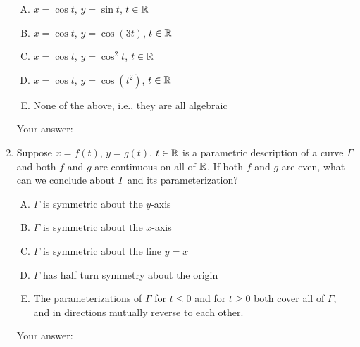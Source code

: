\documentclass[10pt]{amsart}
\begin{document}
\begin{enumerate}
  \begin{enumerate}[(A)]
  \item $x = \cos t$, $y = \sin t$, $t \in \mathbb{R}$
  \item $x = \cos t$, $y = \cos(3t)$, $t \in \mathbb{R}$
  \item $x = \cos t$, $y = \cos^2t$, $t \in \mathbb{R}$
  \item $x = \cos t$, $y = \cos(t^2)$, $t \in \mathbb{R}$
  \item None of the above, i.e., they are all algebraic
  \end{enumerate}

  \vspace{0.1in}
  Your answer: $\underline{\qquad\qquad\qquad\qquad\qquad\qquad\qquad}$
  \vspace{0.6in}

\item Suppose $x = f(t)$, $y = g(t)$, $t \in \mathbb{R}$ is a parametric
  description of a curve $\Gamma$ and both $f$ and $g$ are continuous
  on all of $\mathbb{R}$. If both $f$ and $g$ are even, what can we conclude
  about $\Gamma$ and its parameterization?

  \begin{enumerate}[(A)]
  \item $\Gamma$ is symmetric about the $y$-axis
  \item $\Gamma$ is symmetric about the $x$-axis
  \item $\Gamma$ is symmetric about the line $y = x$
  \item $\Gamma$ has half turn symmetry about the origin
  \item The parameterizations of $\Gamma$ for $t \le 0$ and for $t \ge
    0$ both cover all of $\Gamma$, and in directions mutually reverse
    to each other.
  \end{enumerate}

  \vspace{0.1in}
  Your answer: $\underline{\qquad\qquad\qquad\qquad\qquad\qquad\qquad}$
  \vspace{0.6in}

\end{enumerate}
\end{document}
